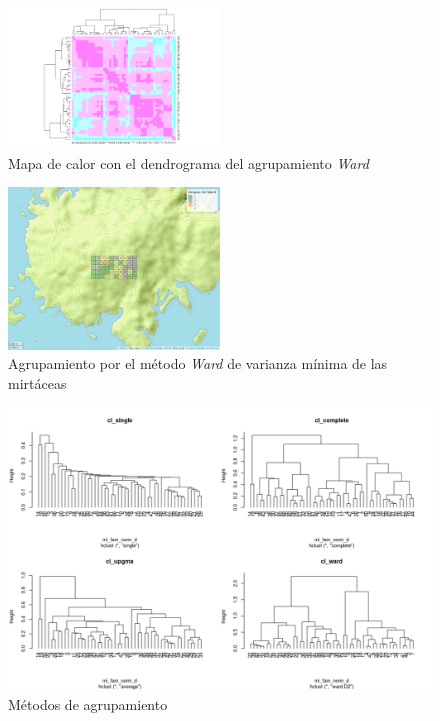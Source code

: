 \documentclass[11pt,]{article}
\begin{document}
\begin{figure}
\centering
\includegraphics[width=0.50000\textwidth]{Mapadecalor_Ward_aa2.png}
\caption{Mapa de calor con el dendrograma del agrupamiento \emph{Ward}
\label{fig:mapadecalor_ward}}
\end{figure}

\begin{figure}
\centering
\includegraphics[width=0.50000\textwidth]{mapa_ward_k4.png}
\caption{Agrupamiento por el método \emph{Ward} de varianza mínima de
las mirtáceas \label{fig:mapa_ward}}
\end{figure}

\begin{figure}
\centering
\includegraphics{metodosdeagrupamiento.png}
\caption{Métodos de agrupamiento \label{fig:metodosdeagrupamiento}}
\end{figure}
\end{document}
